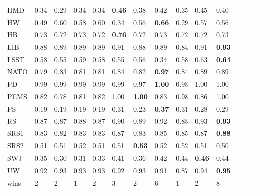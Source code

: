 \begin{table}
\begin{tabular}{p{0.6cm}*{16}{p{0.45cm}}}
    HMD &          0.34 &          0.29 &          0.34 &          0.34 & \textbf{0.46} &          0.38 &          0.42 &          0.35 &          0.45 &          0.40 \\
     HW &          0.49 &          0.60 &          0.58 &          0.60 &          0.34 &          0.56 & \textbf{0.66} &          0.29 &          0.57 &          0.56 \\
     HB &          0.73 &          0.72 &          0.73 &          0.72 & \textbf{0.76} &          0.72 &          0.73 &          0.72 &          0.72 &          0.73 \\
    LIB &          0.88 &          0.89 &          0.89 &          0.89 &          0.91 &          0.88 &          0.89 &          0.84 &          0.91 & \textbf{0.93} \\
   LSST &          0.58 &          0.55 &          0.59 &          0.58 &          0.55 &          0.56 &          0.34 &          0.58 &          0.63 & \textbf{0.64} \\
   NATO &          0.79 &          0.83 &          0.81 &          0.81 &          0.84 &          0.82 & \textbf{0.97} &          0.84 &          0.89 &          0.89 \\
     PD &          0.99 &          0.99 &          0.99 &          0.99 &          0.99 &          0.97 & \textbf{1.00} &          0.98 &          1.00 &          1.00 \\
   PEMS &          0.82 &          0.78 &          0.81 &          0.82 &          1.00 & \textbf{1.00} &          0.83 &          0.98 &          0.86 &          1.00 \\
     PS &          0.19 &          0.19 &          0.19 &          0.19 &          0.31 &          0.23 & \textbf{0.37} &          0.31 &          0.28 &          0.29 \\
     RS &          0.87 &          0.87 &          0.88 &          0.87 &          0.90 &          0.89 &          0.92 &          0.88 &          0.93 & \textbf{0.93} \\
   SRS1 &          0.83 &          0.82 &          0.83 &          0.83 &          0.87 &          0.83 &          0.85 &          0.85 &          0.87 & \textbf{0.88} \\
   SRS2 &          0.51 &          0.51 &          0.52 &          0.51 &          0.51 & \textbf{0.53} &          0.52 &          0.52 &          0.51 &          0.50 \\
    SWJ &          0.35 &          0.30 &          0.31 &          0.33 &          0.41 &          0.36 &          0.42 &          0.44 & \textbf{0.46} &          0.44 \\
     UW &          0.92 &          0.93 &          0.93 &          0.93 &          0.92 &          0.93 &          0.91 &          0.87 &          0.94 & \textbf{0.95} \\
   wins &             2 &             2 &             1 &             2 &             3 &             2 &             6 &             1 &             2 &             8 \\
\bottomrule
\end{tabular}
\end{table}
